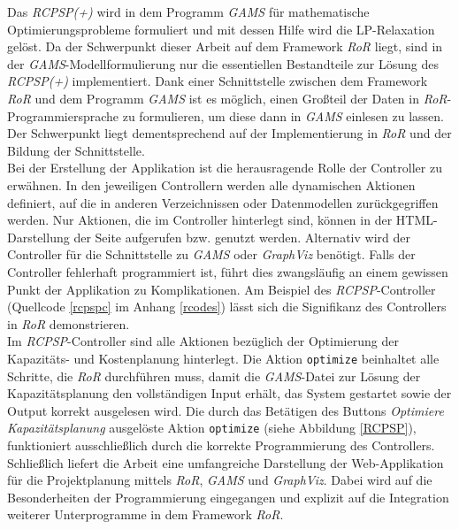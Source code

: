 \documentclass[a4paper,12pt,parskip,bibtotoc,liststotoc]{article}
\begin{document}
Das \textit{RCPSP(+)} wird in dem Programm \textit{GAMS} für mathematische Optimierungsprobleme formuliert und mit dessen Hilfe wird die LP-Relaxation gelöst. Da der Schwerpunkt dieser Arbeit auf dem Framework \textit{RoR} liegt, sind in der \textit{GAMS}-Modellformulierung nur die essentiellen Bestandteile zur Lösung des \textit{RCPSP(+)} implementiert. Dank einer Schnittstelle zwischen dem Framework \textit{RoR} und dem Programm \textit{GAMS} ist es möglich, einen Großteil der Daten in \textit{RoR}-Programmiersprache zu formulieren, um diese dann in \textit{GAMS} einlesen zu lassen. Der Schwerpunkt liegt dementsprechend auf der Implementierung in \textit{RoR} und der Bildung der Schnittstelle.\\

Bei der Erstellung der Applikation ist die herausragende Rolle der Controller zu erwähnen. %
In den jeweiligen Controllern werden alle dynamischen Aktionen definiert, auf die in anderen Verzeichnissen oder Datenmodellen zurückgegriffen werden. Nur Aktionen, die im Controller hinterlegt sind, können in der HTML-Darstellung der Seite aufgerufen bzw. genutzt werden. Alternativ wird der Controller für die Schnittstelle zu \textit{GAMS} oder \textit{GraphViz} benötigt. Falls der Controller fehlerhaft programmiert ist, führt dies zwangsläufig an einem gewissen Punkt der Applikation zu Komplikationen. Am Beispiel des \textit{RCPSP}-Controller (Quellcode \ref{rcpspc} im Anhang \ref{rcodes}) lässt sich die Signifikanz des Controllers in \textit{RoR} demonstrieren.\\

Im \textit{RCPSP}-Controller sind alle Aktionen bezüglich der Optimierung der Kapazitäts- und Kostenplanung hinterlegt. Die Aktion \texttt{optimize} beinhaltet alle Schritte, die \textit{RoR} durchführen muss, damit die \textit{GAMS}-Datei zur Lösung der Kapazitätsplanung den vollständigen Input erhält, das System gestartet sowie der Output korrekt ausgelesen wird. Die durch das Betätigen des Buttons \textit{Optimiere Kapazitätsplanung} ausgelöste Aktion \texttt{optimize} (siehe Abbildung \ref{RCPSP}), funktioniert ausschließlich durch die korrekte Programmierung des Controllers.\\   

Schließlich liefert die Arbeit eine umfangreiche Darstellung der Web-Applikation für die Projektplanung mittels \textit{RoR}, \textit{GAMS} und \textit{GraphViz}. Dabei wird auf die Besonderheiten der Programmierung eingegangen und explizit auf die Integration weiterer Unterprogramme in dem Framework \textit{RoR}.
\end{document}
